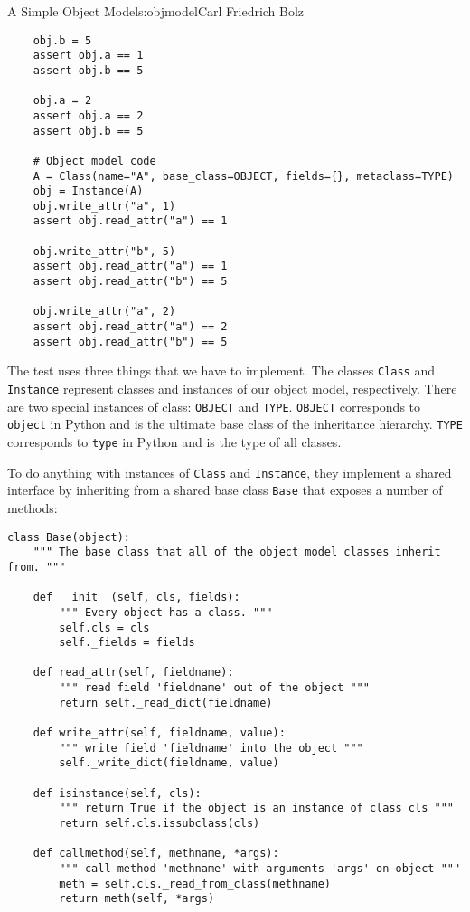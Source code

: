\begin{aosachapter}{A Simple Object Model}{s:objmodel}{Carl Friedrich Bolz}
\begin{verbatim}
    obj.b = 5
    assert obj.a == 1
    assert obj.b == 5

    obj.a = 2
    assert obj.a == 2
    assert obj.b == 5

    # Object model code
    A = Class(name="A", base_class=OBJECT, fields={}, metaclass=TYPE)
    obj = Instance(A)
    obj.write_attr("a", 1)
    assert obj.read_attr("a") == 1

    obj.write_attr("b", 5)
    assert obj.read_attr("a") == 1
    assert obj.read_attr("b") == 5

    obj.write_attr("a", 2)
    assert obj.read_attr("a") == 2
    assert obj.read_attr("b") == 5
\end{verbatim}

The test uses three things that we have to implement. The classes
\texttt{Class} and \texttt{Instance} represent classes and instances of
our object model, respectively. There are two special instances of
class: \texttt{OBJECT} and \texttt{TYPE}. \texttt{OBJECT} corresponds to
\texttt{object} in Python and is the ultimate base class of the
inheritance hierarchy. \texttt{TYPE} corresponds to \texttt{type} in
Python and is the type of all classes.

To do anything with instances of \texttt{Class} and \texttt{Instance},
they implement a shared interface by inheriting from a shared base class
\texttt{Base} that exposes a number of methods:

\begin{verbatim}
class Base(object):
    """ The base class that all of the object model classes inherit from. """

    def __init__(self, cls, fields):
        """ Every object has a class. """
        self.cls = cls
        self._fields = fields

    def read_attr(self, fieldname):
        """ read field 'fieldname' out of the object """
        return self._read_dict(fieldname)

    def write_attr(self, fieldname, value):
        """ write field 'fieldname' into the object """
        self._write_dict(fieldname, value)

    def isinstance(self, cls):
        """ return True if the object is an instance of class cls """
        return self.cls.issubclass(cls)

    def callmethod(self, methname, *args):
        """ call method 'methname' with arguments 'args' on object """
        meth = self.cls._read_from_class(methname)
        return meth(self, *args)


\end{verbatim}
\end{aosachapter}

